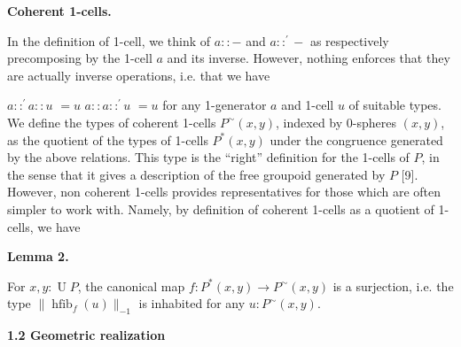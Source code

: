 \documentclass[10pt,a4paper]{amsart}
\begin{document}
 
 
 
\par\medskip\noindent\textbf{Coherent 1-cells.}\par
 
 
In the definition of 1-cell, we think of $a::-$ and $a::^{\prime}-$ as respectively precomposing by the 1-cell $a$ and its inverse. However, nothing enforces that they are actually inverse operations, i.e. that we have\par
    $\displaystyle a::^{\prime}a::u$ $\displaystyle=u$ $\displaystyle a::a::^{\prime}u$ $\displaystyle=u$    
for any 1-generator $a$ and 1-cell $u$ of suitable types. We define the types of coherent 1-cells $P^{\sim}(x,y)$, indexed by 0-spheres $(x,y)$, as the quotient of the types of 1-cells $P^{*}(x,y)$ under the congruence generated by the above relations. This type is the “right” definition for the 1-cells of $P$, in the sense that it gives a description of the free groupoid generated by $P$ [9]. However, non coherent 1-cells provides representatives for those which are often simpler to work with. Namely, by definition of coherent 1-cells as a quotient of 1-cells, we have\par
 
 
 
\par\medskip\noindent\textbf{Lemma 2.}\par
 
 
For $x,y:\operatorname{U}P$, the canonical map $f:P^{*}(x,y)\to P^{\sim}(x,y)$ is a surjection, i.e. the type $\|\operatorname{hfib}_{f}(u)\|_{-1}$ is inhabited for any $u:P^{\sim}(x,y)$.\par
 
 
 
 
 
 
\par\medskip\noindent\textbf{1.2 Geometric realization}\par
 
\end{document}

